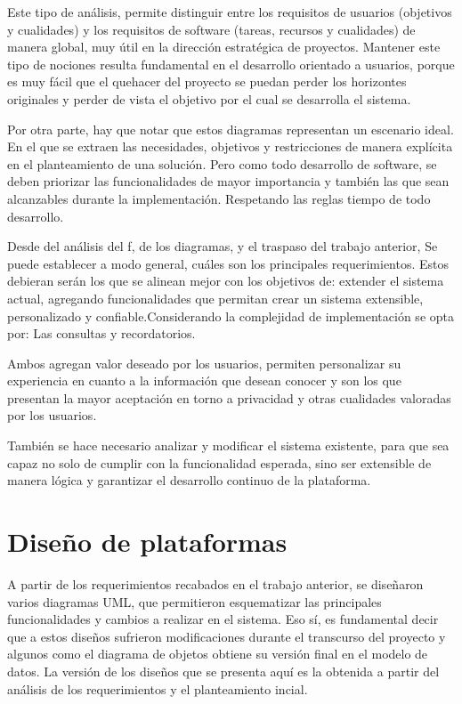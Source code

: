     \par Este tipo de análisis, permite distinguir entre los requisitos de usuarios (objetivos y cualidades) y los requisitos de software (tareas, recursos y cualidades) de manera global, muy útil en la dirección estratégica de proyectos. Mantener este tipo de nociones resulta fundamental en el desarrollo orientado a usuarios, porque es muy fácil que el quehacer del proyecto se puedan perder los horizontes originales y perder de vista el objetivo por el cual se desarrolla el sistema.
    \par Por otra parte, hay que notar que estos diagramas representan un escenario ideal. En el que se extraen las necesidades, objetivos y restricciones de manera explícita en el planteamiento de una solución. Pero como todo desarrollo de software, se deben priorizar las funcionalidades de mayor importancia y también las que sean alcanzables durante la implementación. Respetando las reglas tiempo de todo desarrollo.
    \par Desde del análisis del \acrlong{f}, de los diagramas, y el traspaso del trabajo anterior, Se puede establecer a modo general, cuáles son los principales requerimientos. Estos debieran serán los que se alinean mejor con los objetivos de: \guillemotleft extender el sistema actual, agregando funcionalidades que permitan crear un sistema extensible, personalizado y confiable.\guillemotright Considerando la complejidad de implementación se opta por: Las consultas y recordatorios. 
    \par Ambos agregan valor deseado por los usuarios, permiten personalizar su experiencia en cuanto a la información que desean conocer y son los que presentan la mayor aceptación en torno a privacidad y otras cualidades valoradas por los usuarios.
    \par También se hace necesario analizar y modificar el sistema existente, para que sea capaz no solo de cumplir con la funcionalidad esperada, sino ser extensible de manera lógica y garantizar el desarrollo continuo de la plataforma.

\section{Diseño de plataformas}
    A partir de los requerimientos recabados en el trabajo anterior, se diseñaron varios diagramas UML, que permitieron esquematizar las principales funcionalidades y cambios a realizar en el sistema. Eso sí, es fundamental decir que a estos diseños sufrieron modificaciones durante el transcurso del proyecto y algunos como el diagrama de objetos obtiene su versión final en el modelo de datos. La versión de los diseños que se presenta aquí es la obtenida a partir del análisis de los requerimientos y el planteamiento incial.

